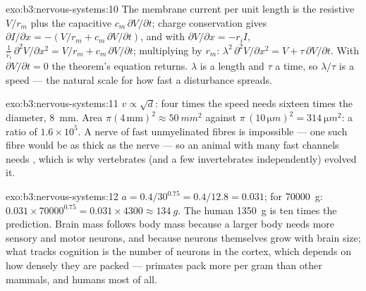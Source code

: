 \begin{solution}{exo:b3:nervous-systems:10}
The membrane current per unit length is the resistive $V/r_{m}$ plus
the capacitive $c_{m}\,\partial V/\partial t$; charge conservation gives
$\partial I/\partial x = -(V/r_{m} + c_{m}\,\partial V/\partial t)$, and
with $\partial V/\partial x = -r_{i}I$, $\frac{1}{r_{i}}\,\partial^{2}V/
\partial x^{2} = V/r_{m} + c_{m}\,\partial V/\partial t$; multiplying by
$r_{m}$: $\lambda^{2}\,\partial^{2}V/\partial x^{2} = V + \tau\,\partial
V/\partial t$. With $\partial V/\partial t = 0$ the theorem's equation
returns. $\lambda$ is a length and $\tau$ a time, so $\lambda/\tau$ is
a speed --- the natural scale for how fast a disturbance spreads.
\end{solution}

\begin{solution}{exo:b3:nervous-systems:11}
$v \propto \sqrt{d}$: four times the speed needs sixteen times the
diameter, \qty{8}{mm}. Area $\pi(4\,\text{mm})^{2} \approx \qty{50}{mm^2}$
against $\pi\,(10\,\unit{\micro m})^{2} = \qty{314}{\micro m^2}$: a ratio of
$1.6\times 10^{5}$. A nerve of fast unmyelinated fibres is impossible
--- one such fibre would be as thick as the nerve --- so an animal with
many fast channels needs , which is why vertebrates (and a few
invertebrates independently) evolved it.
\end{solution}

\begin{solution}{exo:b3:nervous-systems:12}
$a = 0.4/30^{0.75} = 0.4/12.8 = 0.031$; for \qty{70000}{g}: $0.031\times
\num{70000}^{0.75} = 0.031\times 4300 \approx \qty{134}{g}$. The human
\qty{1350}{g} is ten times the prediction. Brain mass follows body
mass because a larger body needs more sensory and motor neurons, and
because neurons themselves grow with brain size; what tracks cognition
is the number of neurons in the cortex, which depends on how densely
they are packed --- primates pack more per gram than other mammals,
and humans most of all.
\end{solution}

